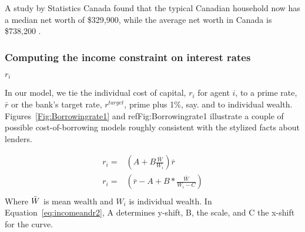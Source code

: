  A study by Statistics Canada found that the typical Canadian household now has a median net worth of \$329,900, while the average net worth in Canada is \$738,200 \cite{stats-can-median-net-worth}.  %

\subsubsection{Computing the income constraint on interest rates}\label{SS:YWealthConstraint}
$r_i$

In our model, we  tie the individual cost of capital,  $r_i$ for agent $i$, to a prime rate, $\bar r$ or the bank's target rate, $r^{target}$, prime plus 1\%, say. and to individual wealth. Figures~\ref{Fig:Borrowingrate1} and ref{Fig:Borrowingrate1} illustrate a couple of possible  cost-of-borrowing models roughly consistent  with the stylized facts about lenders. 

\begin{align}
 r_i =  &  \left(A + B \frac{\bar{W}}{W_i}\right) \bar r       \label{eq:incomeandr1}  \\
 r_i =  &  \left(\bar r - A + B *\frac{\bar W}{W_i - C}\right) \label{eq:incomeandr2}  \\
\end{align}
Where $\Bar{W}$ is mean wealth and $W_i$ is individual wealth. In Equation~\ref{eq:incomeandr2},  A determines y-shift, B, the scale, and C the  x-shift for the curve.


